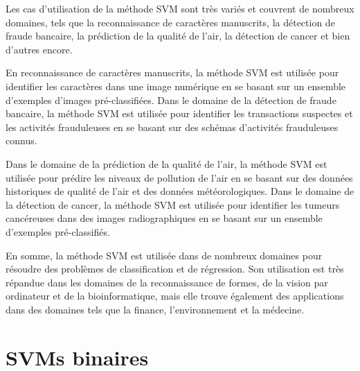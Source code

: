 \documentclass[12pt,a4paper]{report}
\begin{document}
	
	Les cas d'utilisation de la méthode SVM sont très variés et couvrent de nombreux domaines, tels que la reconnaissance de caractères manuscrits, la détection de fraude bancaire, la prédiction de la qualité de l'air, la détection de cancer et bien d'autres encore.
	
	En reconnaissance de caractères manuscrits, la méthode SVM est utilisée pour identifier les caractères dans une image numérique en se basant sur un ensemble d'exemples d'images pré-classifiées. Dans le domaine de la détection de fraude bancaire, la méthode SVM est utilisée pour identifier les transactions suspectes et les activités frauduleuses en se basant sur des schémas d'activités frauduleuses connus.
	
	Dans le domaine de la prédiction de la qualité de l'air, la méthode SVM est utilisée pour prédire les niveaux de pollution de l'air en se basant sur des données historiques de qualité de l'air et des données météorologiques. Dans le domaine de la détection de cancer, la méthode SVM est utilisée pour identifier les tumeurs cancéreuses dans des images radiographiques en se basant sur un ensemble d'exemples pré-classifiés.
	
	En somme, la méthode SVM est utilisée dans de nombreux domaines pour résoudre des problèmes de classification et de régression. Son utilisation est très répandue dans les domaines de la reconnaissance de formes, de la vision par ordinateur et de la bioinformatique, mais elle trouve également des applications dans des domaines tels que la finance, l'environnement et la médecine.
	
	
	
	\newpage
	
	\chapter{SVMs binaires }
\end{document}
